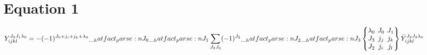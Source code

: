 \documentclass{scrartcl}
\newcommand{\ninej}[9]{\begingroup\setlength{\arraycolsep}{0.2em}\begin{Bmatrix} #1 & #2 & #3 \\ #4 & #5 & #6 \\ #7 & #8 & #9 \end{Bmatrix}\endgroup}
\begin{document}
\section{Equation 1}
\begin{dmath*}
Y_{i j k l}^{{J}_{0} {J}_{1} {{\lambda}}_{0}} = -(-1)^{{J}_{0}+{j}_{i}+{j}_{k}+{{\lambda}}_{0}} \* \hatfact{{J}_{0}} \* \hatfact{{J}_{1}} \* \sum_{{J}_{2} {J}_{3}} \* (-1)^{{J}_{2}} \* \hatfact{{J}_{2}} \* \hatfact{{J}_{3}} \* \ninej{{{\lambda}}_{0}}{{J}_{0}}{{J}_{1}}{{J}_{3}}{{j}_{j}}{{j}_{k}}{{J}_{2}}{{j}_{i}}{{j}_{l}} \* \bar{Y}_{i j k l}^{{J}_{2} {J}_{3} {{\lambda}}_{0}}
\end{dmath*}
\end{document}
